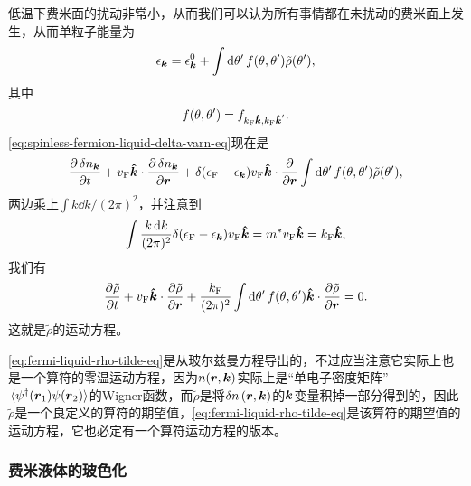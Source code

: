 低温下费米面的扰动非常小，从而我们可以认为所有事情都在未扰动的费米面上发生，从而单粒子能量为
\begin{equation}
    \epsilon_{\vb*{k}} = \epsilon_{\vb*{k}}^0 + \int \dd{\theta'} f(\theta, \theta') \tilde{\rho}(\theta'),
\end{equation}
其中
\begin{equation}
    f(\theta, \theta') = f_{k_\text{F} \vu*{k}, k_\text{F} \vu*{k}'}.
\end{equation}
\eqref{eq:spinless-fermion-liquid-delta-varn-eq}现在是
\[
    \pdv{\var{n_{\vb*{k}}}}{t} + v_\text{F} \vu*{k} \cdot \pdv{\var{n}_{\vb*{k}}}{\vb*{r}} + \delta(\epsilon_\text{F} - \epsilon_{\vb*{k}}) v_\text{F} \vu*{k} \cdot \pdv{\vb*{r}} \int \dd{\theta'} f(\theta, \theta') \tilde{\rho}(\theta'),
\]
两边乘上$\int k \dd{k} / (2\pi)^2$，并注意到
\[
    \int \frac{k \dd{k}}{(2\pi)^2} \delta(\epsilon_\text{F} - \epsilon_{\vb*{k}}) v_\text{F} \vu*{k} = m^* v_\text{F} \vu*{k} = k_\text{F} \vu*{k},
\]
我们有
\begin{equation}
    \pdv{\tilde{\rho}}{t} + v_\text{F} \vu*{k} \cdot \pdv{\tilde{\rho}}{\vb*{r}} + \frac{k_\text{F}}{(2\pi)^2} \int \dd{\theta'} f(\theta, \theta') \vu*{k} \cdot \pdv{\tilde{\rho}}{\vb*{r}} = 0.
    \label{eq:fermi-liquid-rho-tilde-eq}
\end{equation}
这就是$\tilde{\rho}$的运动方程。

\eqref{eq:fermi-liquid-rho-tilde-eq}是从玻尔兹曼方程导出的，不过应当注意它实际上也是一个算符的零温运动方程，因为$n(\vb*{r}, \vb*{k})$实际上是“单电子密度矩阵”$\expval*{\psi^\dagger(\vb*{r}_1) \psi(\vb*{r}_2)}$的Wigner函数，而$\tilde{\rho}$是将$\var{n}(\vb*{r}, \vb*{k})$的$\vb*{k}$变量积掉一部分得到的，因此$\tilde{\rho}$是一个良定义的算符的期望值，\eqref{eq:fermi-liquid-rho-tilde-eq}是该算符的期望值的运动方程，它也必定有一个算符运动方程的版本。

\subsubsection{费米液体的玻色化}

